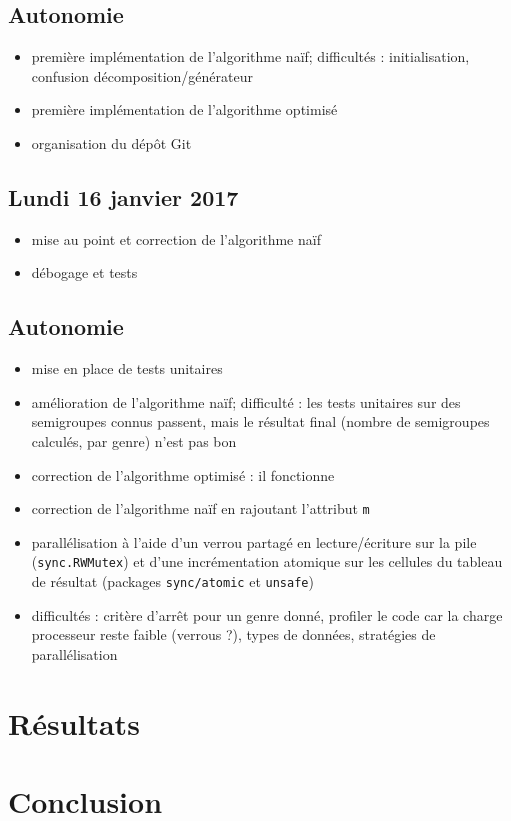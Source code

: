 \documentclass[12pt,a4paper]{article}
\begin{document}
\subsection*{Autonomie}

\begin{itemize}
	\item	première implémentation de l'algorithme naïf; difficultés : initialisation, confusion décomposition/générateur
	\item	première implémentation de l'algorithme optimisé
	\item	organisation du dépôt Git
\end{itemize}

\subsection*{Lundi 16 janvier 2017}

\begin{itemize}
	\item	mise au point et correction de l'algorithme naïf
	\item	débogage et tests
\end{itemize}

\subsection*{Autonomie}

\begin{itemize}
	\item	mise en place de tests unitaires
	\item	amélioration de l'algorithme naïf; difficulté : les tests unitaires sur des semigroupes connus passent, mais le résultat final (nombre de semigroupes calculés, par genre) n'est pas bon
	\item	correction de l'algorithme optimisé : il fonctionne
	\item	correction de l'algorithme naïf en rajoutant l'attribut \texttt{m}
	\item	parallélisation à l'aide d'un verrou partagé en lecture/écriture sur la pile (\texttt{sync.RWMutex}) et d'une incrémentation atomique sur les cellules du tableau de résultat (packages \texttt{sync/atomic} et \texttt{unsafe})
	\item	difficultés : critère d'arrêt pour un genre donné, profiler le code car la charge processeur reste faible (verrous ?), types de données, stratégies de parallélisation
\end{itemize}

\section*{Résultats}

\section*{Conclusion}
\end{document}
